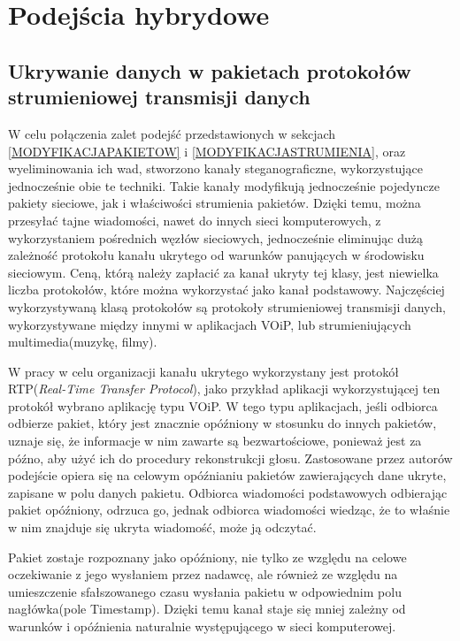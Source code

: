 \documentclass[a4paper, twoside, 12pt]{report}
\begin{document}
    \section{Podejścia hybrydowe}
        \subsection{Ukrywanie danych w pakietach protokołów strumieniowej transmisji danych}
        W celu połączenia zalet podejść przedstawionych w sekcjach
        \ref{MODYFIKACJAPAKIETOW} i \ref{MODYFIKACJASTRUMIENIA}, oraz wyeliminowania
        ich wad, stworzono kanały steganograficzne, wykorzystujące jednocześnie obie te
        techniki. Takie kanały modyfikują jednocześnie pojedyncze pakiety sieciowe,
        jak i właściwości strumienia pakietów. Dzięki temu, można przesyłać tajne wiadomości,
        nawet do innych sieci komputerowych, z wykorzystaniem pośrednich węzłów sieciowych,
        jednocześnie eliminując dużą zależność protokołu kanału ukrytego od warunków
        panujących w środowisku sieciowym. Ceną, którą należy zapłacić za kanał
        ukryty tej klasy, jest niewielka liczba protokołów, które można wykorzystać
        jako kanał podstawowy. Najczęściej wykorzystywaną klasą protokołów są
        protokoły strumieniowej transmisji danych, wykorzystywane między innymi
        w aplikacjach VOiP, lub strumieniujących multimedia(muzykę, filmy).

        W pracy \cite{VOIPSTEGANOGRAPHY} w celu organizacji kanału ukrytego wykorzystany
        jest protokół RTP(\emph{Real-Time Transfer Protocol}), jako przykład aplikacji
        wykorzystującej ten protokół wybrano aplikację typu VOiP. W tego typu aplikacjach,
        jeśli odbiorca odbierze pakiet, który jest znacznie opóźniony w stosunku
        do innych pakietów, uznaje się, że informacje w nim zawarte są bezwartościowe,
        ponieważ jest za późno, aby użyć ich do procedury rekonstrukcji głosu.
        Zastosowane przez autorów podejście opiera się na celowym opóźnianiu pakietów
        zawierających dane ukryte, zapisane w polu danych pakietu.
        Odbiorca wiadomości podstawowych odbierając pakiet
        opóźniony, odrzuca go, jednak odbiorca wiadomości wiedząc, że to właśnie
        w nim znajduje się ukryta wiadomość, może ją odczytać.

        Pakiet zostaje rozpoznany jako opóźniony, nie tylko ze względu na celowe
        oczekiwanie z jego wysłaniem przez nadawcę, ale również ze względu
        na umieszczenie sfałszowanego czasu wysłania pakietu w odpowiednim
        polu nagłówka(pole Timestamp). Dzięki temu kanał staje się mniej zależny
        od warunków i opóźnienia naturalnie występującego w sieci komputerowej.
\end{document}
